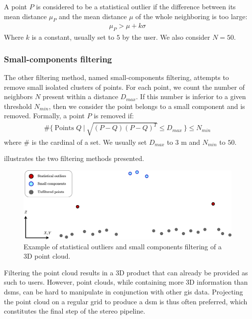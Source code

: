 A point $P$ is considered to be a statistical outlier if the difference between its mean distance $\mu_P$ and the mean distance $\mu$ of the whole neighboring is too large:
\begin{align}\label{eq:statistical_outlier}
    \mu_P>\mu+k\sigma
\end{align}
Where $k$ is a constant, usually set to $5$ by the user. We also consider $N=50$.

\subsubsection{Small-components filtering}
The other filtering method, named small-components filtering, attempts to remove small isolated clusters of points. For each point, we count the number of neighbors $N$ present within a distance $D_{max}$. If this number is inferior to a given threshold $N_{min}$, then we consider the point belongs to a small component and is removed. Formally, a point $P$ is removed if:
\begin{align}\label{eq:small_components}
    \#\{~\text{Points } Q~|~\sqrt{(P-Q)(P-Q)^T}\leqslant D_{max}~\}\leqslant N_{min}
\end{align}
where $\#$ is the cardinal of a set. We usually set $D_{max}$ to $3$ m and $N_{min}$ to $50$.

 illustrates the two filtering methods presented.

\begin{figure}
    \centering
    \includegraphics[width=\linewidth]{Images/Chap_1/Point_cloud_filtering.png}
    \caption{Example of statistical outliers and small components filtering of a 3D point cloud.}
    \label{fig:point_cloud_filtering}
\end{figure}

Filtering the point cloud results in a 3D product that can already be provided as such to users. However, point clouds, while containing more 3D information than \acrshort{dsm}s, can be hard to manipulate in conjunction with other \acrshort{gis} data. Projecting the point cloud on a regular grid to produce a \acrshort{dsm} is thus often preferred, which constitutes the final step of the stereo pipeline.

